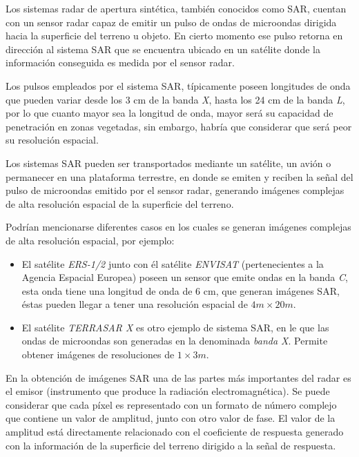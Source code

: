 Los sistemas radar de apertura sintética, también conocidos como SAR, cuentan con un sensor radar capaz de emitir un pulso de ondas de microondas dirigida hacia la superficie del terreno u objeto. En cierto momento ese pulso retorna en dirección al sistema SAR que se encuentra ubicado en un satélite donde la información conseguida es medida por el sensor radar. 

Los pulsos empleados por el sistema SAR, típicamente poseen longitudes de onda que pueden variar desde los 3 cm de la banda \textit{X}, hasta los 24 cm de la banda \textit{L}, por lo que cuanto mayor sea la longitud de onda, mayor será su capacidad de penetración en zonas vegetadas, sin embargo, habría que considerar que será peor su resolución espacial.

Los sistemas SAR pueden ser transportados mediante un satélite, un avión o permanecer en una plataforma terrestre, en donde se emiten y reciben la señal del pulso de microondas emitido por el sensor radar, generando imágenes complejas de alta resolución espacial de la superficie del terreno.

Podrían mencionarse diferentes casos en los cuales se generan imágenes complejas de alta resolución espacial, por ejemplo:
\begin{itemize}
\item El satélite \textit{ERS-1/2} \cite{Wolff2022Dec} junto con él satélite \textit{ENVISAT} (pertenecientes a la Agencia Espacial Europea) poseen un sensor que emite ondas en la banda \textit{C}, esta onda tiene una longitud de onda de 6 cm, que generan imágenes SAR, éstas pueden llegar a tener una resolución espacial de $ 4 m \times 20 m$.
\item El satélite \textit{TERRASAR X} \cite{TerraSAR} es otro ejemplo de sistema SAR, en le que las ondas de microondas son generadas en la denominada \textit{banda X}. Permite obtener imágenes de resoluciones de $1 \times 3 m$.
\end{itemize}


En la obtención de imágenes SAR una de las partes más importantes del radar es el emisor (instrumento que produce la radiación electromagnética). Se puede considerar que cada píxel es representado con un formato de número complejo que contiene un valor de amplitud, junto con otro valor de fase. El valor de la amplitud está directamente relacionado con el coeficiente de respuesta generado con la información de la superficie del terreno dirigido a la señal de respuesta\cite{RigoRibas2004}.

